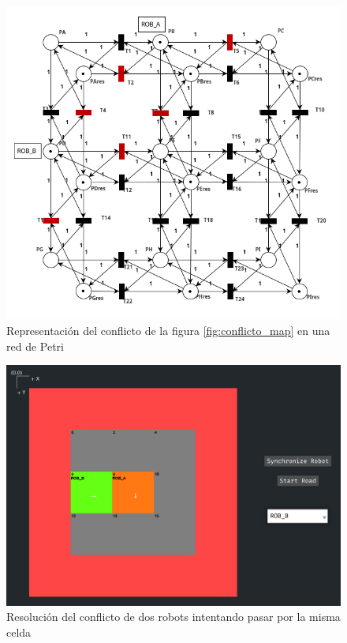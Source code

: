 \begin{figure}[H]
    \centering
    \includegraphics[width=0.7\linewidth]{images/rdp_no_grid_conflicto.png}
    \caption{Representación del conflicto de la figura \ref{fig:conflicto_map} en una red de Petri}
    \label{fig:rdp_no_grid_conflicto}
\end{figure}

\begin{figure}[H]
    \centering
    \includegraphics[width=0.7\linewidth]{images/conflicto_map_solucionado.png}
    \caption{Resolución del conflicto de dos robots intentando pasar por la misma celda}
    \label{fig:conflicto_map_solucionado}
\end{figure}

